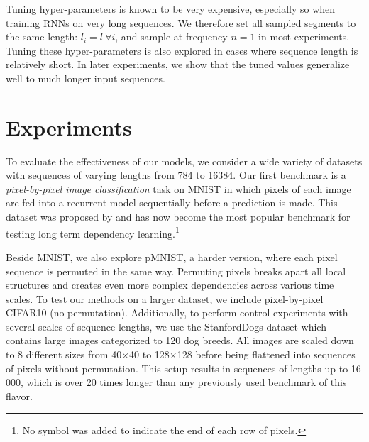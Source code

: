 \documentclass{article}
\begin{document}
Tuning hyper-parameters is known to be very expensive, especially so when training RNNs on very long sequences. We therefore set all sampled segments to the same length: $l_i = l \ \forall i$, and sample at frequency $n=1$ in most experiments. Tuning these hyper-parameters is also explored in cases where sequence length is relatively short. In later experiments, we show that the tuned values generalize well to much longer input sequences.

\section{Experiments} 

To evaluate the effectiveness of our models, we consider a wide variety of datasets with sequences of varying lengths from 784 to 16384. Our first benchmark is a {\it pixel-by-pixel image classification} task on MNIST in which pixels of each image are fed into a recurrent model sequentially before a prediction is made. This dataset was proposed by \citet{le2015simple} and has now become the most popular benchmark for testing long term dependency learning.\footnote{No symbol was added to indicate the end of each row of pixels.}

Beside MNIST, we also explore pMNIST, a harder version, where each pixel sequence is permuted in the same way. Permuting pixels breaks apart all local structures and creates even more complex dependencies across various time scales. To test our methods on a larger dataset, we include pixel-by-pixel CIFAR10 (no permutation). Additionally, to perform control experiments with several scales of sequence lengths, we use the StanfordDogs dataset \citep{stanforddogs} which contains large images categorized to 120 dog breeds. All images are scaled down to 8 different sizes from 40$\times$40 to 128$\times$128 before being flattened into sequences of pixels without permutation. This setup results in sequences of lengths up to 16\,000, which is over 20 times longer than any previously used benchmark of this flavor.

\end{document}
